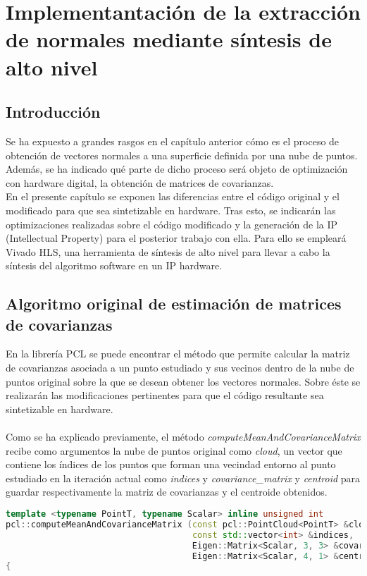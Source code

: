 \chapter{Implementantación de la extracción de normales mediante síntesis de alto nivel}

\section{Introducción}
Se ha expuesto a grandes rasgos en el capítulo anterior cómo es el proceso de obtención de vectores normales a una superficie definida por una nube de puntos. Además, se ha indicado qué parte de dicho proceso será objeto de optimización con hardware digital, la obtención de matrices de covarianzas.
\\
En el presente capítulo se exponen las diferencias entre el código original y el modificado para que sea sintetizable en hardware. Tras esto, se indicarán las optimizaciones realizadas sobre el código modificado y la generación de la IP (Intellectual Property) para el posterior trabajo con ella. Para ello se empleará Vivado HLS, una herramienta de síntesis de alto nivel para llevar a cabo la síntesis del algoritmo software en un IP hardware.




\section{Algoritmo original de estimación de matrices de covarianzas}

En la librería PCL se puede encontrar el método que permite calcular la matriz de covarianzas asociada a un punto estudiado y sus vecinos dentro de la nube de puntos original sobre la que se desean obtener los vectores normales\cite{calculo_covarianzas}. Sobre éste se realizarán las modificaciones pertinentes para que el código resultante sea sintetizable en hardware.
\\
\\
Como se ha explicado previamente, el método \textit{computeMeanAndCovarianceMatrix} recibe como argumentos la nube de puntos original como \textit{cloud}, un vector que contiene los índices de los puntos que forman una vecindad entorno al punto estudiado en la iteración actual como \textit{indices} y \textit{covariance\_matrix} y \textit{centroid} para guardar respectivamente la matriz de covarianzas y el centroide obtenidos.

\begin{lstlisting}[language=C++,breaklines]
  template <typename PointT, typename Scalar> inline unsigned int
pcl::computeMeanAndCovarianceMatrix (const pcl::PointCloud<PointT> &cloud,
                                     const std::vector<int> &indices,
                                     Eigen::Matrix<Scalar, 3, 3> &covariance_matrix,
                                     Eigen::Matrix<Scalar, 4, 1> &centroid)
{
\end{lstlisting}

